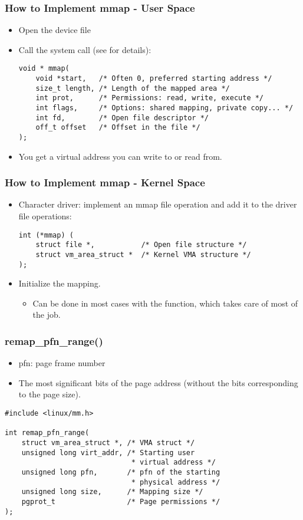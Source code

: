 \begin{frame}[fragile]
  \frametitle{How to Implement mmap - User Space}
  \begin{itemize}
  \item Open the device file
  \item Call the  system call (see  for
    details):
    \begin{verbatim}
void * mmap(
    void *start,   /* Often 0, preferred starting address */
    size_t length, /* Length of the mapped area */
    int prot,      /* Permissions: read, write, execute */
    int flags,     /* Options: shared mapping, private copy... */
    int fd,        /* Open file descriptor */
    off_t offset   /* Offset in the file */
);
    \end{verbatim}
  \item You get a virtual address you can write to or read from.
  \end{itemize}
\end{frame}

\begin{frame}[fragile]
  \frametitle{How to Implement mmap - Kernel Space}
  \begin{itemize}
  \item Character driver: implement an mmap file operation and add it
    to the driver file operations:
    \begin{verbatim}
int (*mmap) (
    struct file *,           /* Open file structure */
    struct vm_area_struct *  /* Kernel VMA structure */
);
    \end{verbatim}
  \item Initialize the mapping.
    \begin{itemize}
    \item Can be done in most cases with the 
      function, which takes care of most of the job.
    \end{itemize}
  \end{itemize}
\end{frame}

\begin{frame}[fragile]
  \frametitle{remap\_pfn\_range()}
  \begin{itemize}
  \item pfn: page frame number
  \item The most significant bits of the page address (without the
    bits corresponding to the page size).
  \end{itemize}
  \begin{verbatim}
#include <linux/mm.h>

int remap_pfn_range(
    struct vm_area_struct *, /* VMA struct */
    unsigned long virt_addr, /* Starting user
                              * virtual address */
    unsigned long pfn,       /* pfn of the starting
                              * physical address */
    unsigned long size,      /* Mapping size */
    pgprot_t                 /* Page permissions */
);
  \end{verbatim}
\end{frame}

